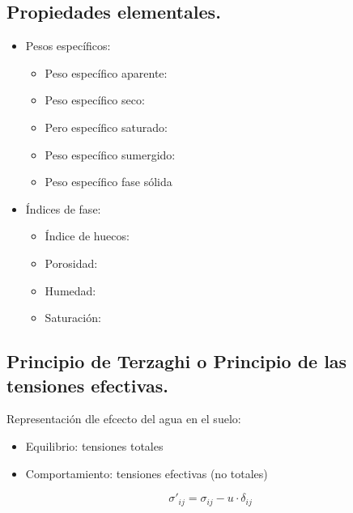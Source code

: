 \subsection{Propiedades elementales.}
\begin{itemize}
    \item Pesos específicos:
    \begin{itemize}
        \item Peso específico aparente:
        \item Peso específico seco:
        \item Pero específico saturado:
        \item Peso específico sumergido:
        \item Peso específico fase sólida
    \end{itemize}
    \item Índices de fase:
    \begin{itemize}
        \item Índice de huecos:
        \item Porosidad:
        \item Humedad:
        \item Saturación:
    \end{itemize}
\end{itemize}

\subsection{Principio de Terzaghi o Principio de las tensiones efectivas.}
Representación dle efcecto del agua en el suelo:
\begin{itemize}
    \item Equilibrio: tensiones totales
    \item Comportamiento: tensiones efectivas (no totales)
\end{itemize}
\[\sigma'_{ij} = \sigma_{ij} - u \cdot \delta_{ij}\]